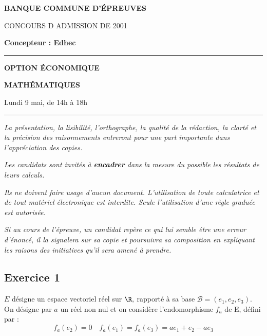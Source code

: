 \documentclass[11pt]{article}%
\begin{document}

\begin{center}
{\LARG\E\textbf{BANQUE COMMUNE D'ÉPREUVES}}



{\large \textsc{CONCOURS D ADMISSION DE 2001}}



{\large \textbf{Concepteur : Edhec}}



\rule{2.39cm}{0.05cm}



{\Large \textbf{OPTION ÉCONOMIQUE}}



{\Large \textbf{MATHÉMATIQUES }}



{\Large Lundi 9 mai, de 14h à 18h}



\rule{2.39cm}{0.05cm}
\end{center}

\textit{La présentation, la lisibilité, l'orthographe, la qualité
de la rédaction, la clarté et la précision des raisonnements
entreront pour une part importante dans l'appréciation des copies.}

\textit{Les candidats sont invités à \textbf{encadrer} dans la mesure
du possible les résultats de leurs calculs.}

\textit{Ils ne doivent faire usage d'aucun document. L'utilisation de
toute
calculatrice et de tout matériel électronique est interdite. Seule
l'utilisation d'une règle graduée est autorisée.}

\textit{Si au cours de l'épreuve, un candidat repère ce qui lui semble
être une erreur d'énoncé, il la signalera sur sa copie et
poursuivra sa composition en expliquant les raisons des initiatives
qu'il sera
amené à prendre.}

\vspace*{3cm}

\subsection*{Exercice 1}

$E$ désigne un espace vectoriel réel sur $\R,$ rapporté à sa base
$\mathcal{B} = (e_{1},e_{2},e_{3})$.\\
On désigne par $a$ un réel non nul et on considère l'endomorphisme
$f_{a}$
de E, défini par : 
\[
f_{a}(e_{2}) = 0\quad f_{a}(e_{1}) = f_{a}(e_{3}) = ae_{1} +
e_{2}-ae_{3}
\]
\end{document}

